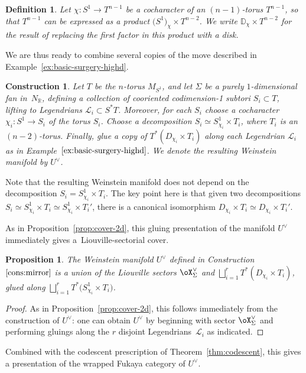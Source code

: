 \documentclass[pdftex]{sigma}%
\numberwithin{equation}{section}
\newtheorem{Proposition}[Theorem]{Proposition}
\newtheorem{Construction}[Theorem]{Construction}
\newtheorem{Definition}[Theorem]{Definition}
\def\DD{\mathbb{D}}
\def\RR{\mathbb{R}}
\def\calL{\mathcal{L}}
\begin{document}
\begin{Definition}
 Let $\chi\colon S^1\to T^{n-1}$ be a cocharacter of an $(n-1)$-torus $T^{n-1}$, so that $T^{n-1}$ can be expressed as a product $\big(S^1\big)_\chi\times T^{n-2}$. We write $\DD_\chi\times T^{n-2}$ for the result of replacing the first factor in this product with a disk.
\end{Definition}

We are thus ready to combine several copies of the move described in Example~\ref{ex:basic-surgery-highd}.

\begin{Construction}\label{cons:mirror}
 Let $T$ be the $n$-torus $M_{S^1}$, and let $\Sigma$ be a purely $1$-dimensional fan in~$N_\RR$, defining a collection of cooriented codimension-1 subtori $S_i\subset T$, lifting to Legendrians $\calL_i\subset S^*T$. Moreover, for each $S_i$ choose a cocharacter $\chi_i\colon S^1 \to S_i$ of the torus $S_i$. Choose a decomposition $S_i \simeq S^1_{\chi_i} \times T_i$, where $T_i$ is an $(n-2)$-torus. Finally, glue a copy of $T^*(D_{\chi_i}\times T_i)$ along each Legendrian $\calL_i$ as in Example~$\ref{ex:basic-surgery-highd}$. We denote the resulting Weinstein manifold by $U^\vee$.
\end{Construction}

Note that the resulting Weinstein manifold does not depend on the decomposition $S_i = S^1_{\chi_i} \times T_i$. The key point here is that given two decompositions $S_i \simeq S^1_{\chi_i} \times T_i \simeq S^1_{\chi_i} \times T_i'$, there is a canonical isomorphism $D_{\chi_i}\times T_i \simeq D_{\chi_i} \times T_i'$.

As in Proposition~\ref{prop:cover-2d}, this gluing presentation of the manifold $U^\vee$ immediately gives a~Liou\-ville-sectorial cover.

\begin{Proposition}\label{prop:cover}
 The Weinstein manifold $U^\vee$ defined in Construction~$\ref{cons:mirror}$ is a union of the Liouville sectors $\oX_\Sigma^\vee$ and $\bigsqcup_{i=1}^r T^*(D_{\chi_i}\times T_i)$, glued along $\bigsqcup_{i=1}^r T^*\big(S^1_{\chi_i}\times T_i\big)$.
\end{Proposition}

\begin{proof}
 As in Proposition~\ref{prop:cover-2d}, this follows immediately from the construction of $U^\vee$: one can obtain $U^\vee$ by beginning with sector $\oX_\Sigma^\vee$ and performing gluings along the $r$ disjoint Legendrians~$\calL_i$ as indicated.
\end{proof}
Combined with the codescent prescription of Theorem~\ref{thm:codescent}, this gives a presentation of the wrapped Fukaya category of $U^\vee$.
\end{document}
